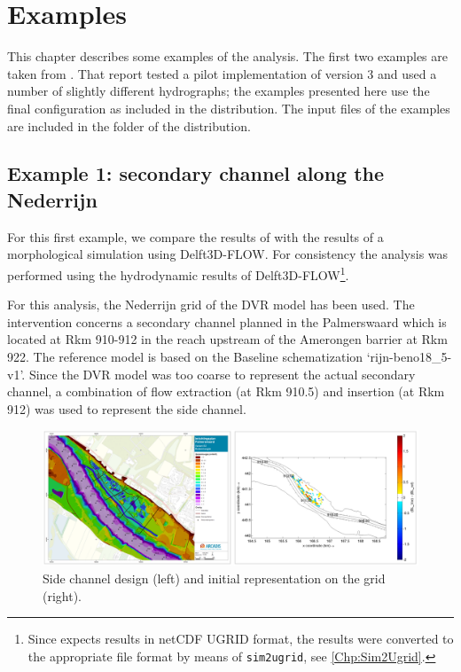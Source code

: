 \chapter{Examples}

This chapter describes some examples of the \dfmi analysis.
The first two examples are taken from \citet{GiriJagers2022}.
That report tested a pilot implementation of \dfmi version 3 and used a number of slightly different hydrographs; the examples presented here use the final configuration as included in the \dfmi distribution.
The input files of the examples are included in the  folder of the \dfmi distribution.

\section{Example 1: secondary channel along the Nederrijn}

For this first example, we compare the results of \dfastmi with the results of a morphological simulation using Delft3D-FLOW.
For consistency the \dfastmi analysis was performed using the hydrodynamic results of Delft3D-FLOW\footnote{Since \dfastmi expects \dflowfm results in netCDF UGRID format, the results were converted to the appropriate file format by means of \texttt{sim2ugrid}, see \autoref{Chp:Sim2Ugrid}.}.

For this analysis, the Nederrijn grid of the DVR model has been used.
The intervention concerns a secondary channel planned in the Palmerswaard which is located at Rkm 910-912 in the reach upstream of the Amerongen barrier at Rkm 922.
The reference model is based on the Baseline schematization ‘rijn-beno18\_5-v1’.
Since the DVR model was too coarse to represent the actual secondary channel, a combination of flow extraction (at Rkm 910.5) and insertion (at Rkm 912) was used to represent the side channel.

\begin{figure}
\includegraphics[width=\columnwidth]{figures/Palmerswaard_proj.png}
\caption{Side channel design (left) and initial representation on the grid (right).}
\label{Palmers_proj}
\end{figure}

